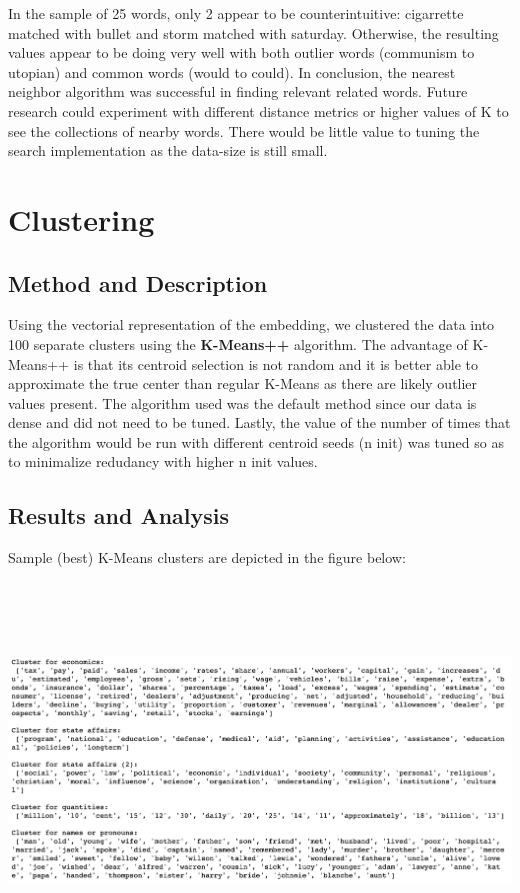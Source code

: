 \documentclass[12pt]{article}
\theoremstyle{plain}
\theoremstyle{definition}
\numberwithin{equation}{theorem}
\begin{document}
\bigskip
In the sample of 25 words, only 2 appear to be counterintuitive: cigarrette matched with bullet and storm matched with saturday. Otherwise, the resulting values appear to be doing very well with both outlier words (communism to utopian) and common words (would to could). In conclusion, the nearest neighbor algorithm was successful in finding relevant related words. Future research could experiment with different distance metrics or higher values of K to see the collections of nearby words. There would be little value to tuning the search implementation as the data-size is still small.


\section{Clustering}
\subsection{Method and Description}

Using the vectorial representation of the embedding, we clustered the data into 100 separate clusters using the \textbf{K-Means++} algorithm. The advantage of K-Means++ is that its centroid selection is not random and it is better able to approximate the true center than regular K-Means as there are likely outlier values present. The algorithm used was the default method since our data is dense and did not need to be tuned. Lastly, the value of the number of times that the algorithm would be run with different centroid seeds (n init) was tuned so as to minimalize redudancy with higher n init values.

\subsection{Results and Analysis}

Sample (best) K-Means clusters are depicted in the figure below:
\bigskip

\begin{center}
\includegraphics[width=16cm, height=10cm]{kmeans_100}
\end{center}
\bigskip
\end{document}
